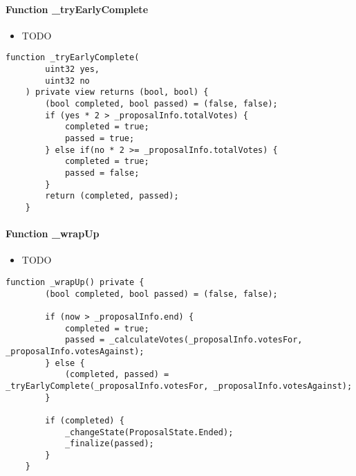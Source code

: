 \paragraph{Function \_{}tryEarlyComplete}

\begin{itemize}
\item TODO
\end{itemize}

\begin{lstlisting}[firstnumber=101]
    function _tryEarlyComplete(
        uint32 yes,
        uint32 no
    ) private view returns (bool, bool) {
        (bool completed, bool passed) = (false, false);
        if (yes * 2 > _proposalInfo.totalVotes) {
            completed = true;
            passed = true;
        } else if(no * 2 >= _proposalInfo.totalVotes) {
            completed = true;
            passed = false;
        }
        return (completed, passed);
    }
\end{lstlisting}

\paragraph{Function \_{}wrapUp}

\begin{itemize}
\item TODO
\end{itemize}

\begin{lstlisting}[firstnumber=116]
    function _wrapUp() private {
        (bool completed, bool passed) = (false, false);

        if (now > _proposalInfo.end) {
            completed = true;
            passed = _calculateVotes(_proposalInfo.votesFor, _proposalInfo.votesAgainst);
        } else {
            (completed, passed) = _tryEarlyComplete(_proposalInfo.votesFor, _proposalInfo.votesAgainst);
        }

        if (completed) {
            _changeState(ProposalState.Ended);
            _finalize(passed);
        }
    }
\end{lstlisting}
